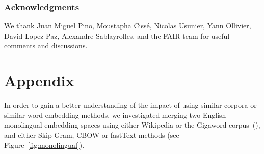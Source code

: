 \documentclass{article} \usepackage{iclr2018_conference,times}
\begin{document}
\subsubsection*{Acknowledgments}
We thank Juan Miguel Pino, Moustapha Ciss\'e, Nicolas Usunier, Yann Ollivier, David Lopez-Paz, Alexandre Sablayrolles, and the FAIR team for useful comments and discussions.




\newpage
\section{Appendix}
In order to gain a better understanding of the impact of using similar corpora or similar word embedding methods, we investigated merging two English monolingual embedding spaces using either Wikipedia or the Gigaword corpus~(\cite{parker2011english}), and either Skip-Gram, CBOW or fastText methods (see Figure~\ref{fig:monolingual}).
\insertmonolingual

\insertexample 
\end{document}
